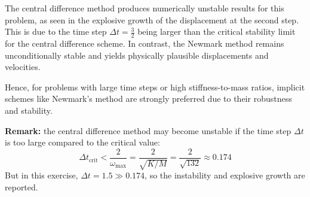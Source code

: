 \documentclass[12pt]{article}
\begin{document}
The central difference method produces numerically unstable results for this problem, as seen in the explosive growth of the displacement at the second step. This is due to the time step $\Delta t = \frac{3}{2}$ being larger than the critical stability limit for the central difference scheme. In contrast, the Newmark method remains unconditionally stable and yields physically plausible displacements and velocities.

Hence, for problems with large time steps or high stiffness-to-mass ratios, implicit schemes like Newmark’s method are strongly preferred due to their robustness and stability.

\textbf{Remark:} the central difference method may become unstable if the time step $\Delta t$ is too large compared to the critical value:
$$\Delta t_{\text{crit}} < \frac{2}{\omega_{\max}} = \frac{2}{\sqrt{K/M}} = \frac{2}{\sqrt{132}} \approx 0.174$$
But in this exercise, $\Delta t = 1.5 \gg 0.174$, so the instability and explosive growth are reported.
\end{document}
